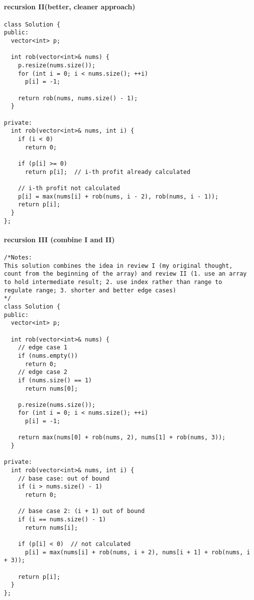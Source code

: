 \documentclass[12pt]{article}
\begin{document}
\paragraph{recursion II(better, cleaner approach)}
\label{sec:orga84192c}
\begin{verbatim}
class Solution {
public:
  vector<int> p;

  int rob(vector<int>& nums) {
    p.resize(nums.size());
    for (int i = 0; i < nums.size(); ++i)
      p[i] = -1;

    return rob(nums, nums.size() - 1);
  }

private:
  int rob(vector<int>& nums, int i) {
    if (i < 0)
      return 0;

    if (p[i] >= 0)
      return p[i];  // i-th profit already calculated

    // i-th profit not calculated  
    p[i] = max(nums[i] + rob(nums, i - 2), rob(nums, i - 1));
    return p[i];
  }
};
\end{verbatim}
\paragraph{recursion III (combine I and II)}
\label{sec:orgc128987}
\begin{verbatim}
/*Notes: 
This solution combines the idea in review I (my original thought, count from the beginning of the array) and review II (1. use an array to hold intermediate result; 2. use index rather than range to regulate range; 3. shorter and better edge cases)
*/
class Solution {
public:
  vector<int> p;

  int rob(vector<int>& nums) {
    // edge case 1
    if (nums.empty())
      return 0;
    // edge case 2
    if (nums.size() == 1)
      return nums[0];

    p.resize(nums.size());
    for (int i = 0; i < nums.size(); ++i)
      p[i] = -1;

    return max(nums[0] + rob(nums, 2), nums[1] + rob(nums, 3));
  }

private:
  int rob(vector<int>& nums, int i) {
    // base case: out of bound
    if (i > nums.size() - 1)
      return 0;

    // base case 2: (i + 1) out of bound
    if (i == nums.size() - 1)
      return nums[i];

    if (p[i] < 0)  // not calculated
      p[i] = max(nums[i] + rob(nums, i + 2), nums[i + 1] + rob(nums, i + 3));

    return p[i];
  }
};
\end{verbatim}
\end{document}
